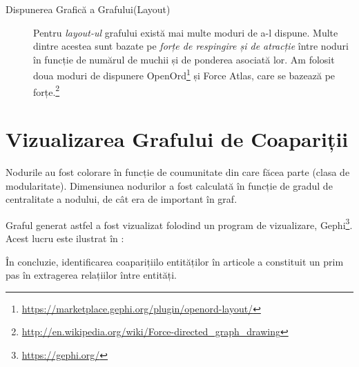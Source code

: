 \begin{description}
 
 \item[Dispunerea Grafică a Grafului(Layout)] Pentru \textit{layout-ul} grafului există mai multe moduri de a-l dispune. Multe dintre acestea sunt bazate pe \textit{forțe de respingire și de atracție} între noduri în funcție de numărul de muchii și de ponderea asociată lor. Am folosit doua moduri de dispunere OpenOrd\footnote{\url{https://marketplace.gephi.org/plugin/openord-layout/}} și Force Atlas, care se bazează pe forțe.\footnote{\url{http://en.wikipedia.org/wiki/Force-directed_graph_drawing}}
\end{description}

 
\section{Vizualizarea Grafului de Coapariții}

Nodurile au fost colorare în funcție de coumunitate din care făcea parte (clasa de modularitate). Dimensiunea nodurilor a fost calculată în funcție de gradul de centralitate a nodului, de cât era de important în graf.

Graful generat astfel a fost vizualizat folodind un program de vizualizare, Gephi\footnote{\url{https://gephi.org/}}. Acest lucru este ilustrat în :



În concluzie, identificarea coaparițiilo entităților în articole a constituit un prim pas în extragerea relațiilor între entități.

